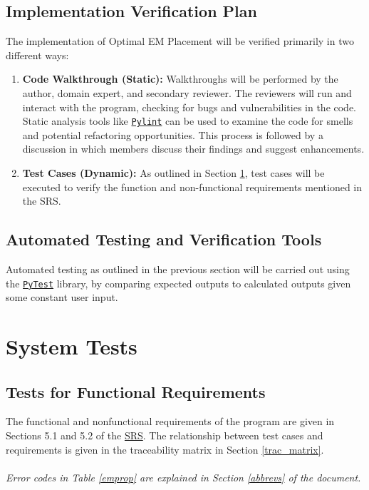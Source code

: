 \documentclass[12pt, titlepage]{article}
\begin{document}
\subsection{Implementation Verification Plan}
The implementation of Optimal EM Placement will be verified primarily in two different ways:
\begin{enumerate}
  \item \textbf{Code Walkthrough (Static): }Walkthroughs will be performed by the author, domain expert, and secondary reviewer. The reviewers will run and interact with the program, checking for bugs and vulnerabilities in the code. Static analysis tools like \href{https://github.com/pylint-dev/pylint}{\texttt{Pylint}} can be used to examine the code for smells and potential refactoring opportunities. This process is followed by a discussion in which members discuss their findings and suggest enhancements.  
  \item \textbf{Test Cases (Dynamic): }As outlined in Section \ref{sys_tests}, test cases will be executed to verify the function and non-functional requirements mentioned in the SRS. 
\end{enumerate}

\subsection{Automated Testing and Verification Tools} \label{ver_tools}
Automated testing as outlined in the previous section will be carried out using the \href{https://docs.pytest.org/en/stable/}{\texttt{PyTest}} library, by comparing expected outputs to calculated outputs given some constant user input. 

\section{System Tests} \label{sys_tests}

\subsection{Tests for Functional Requirements}
The functional and nonfunctional requirements of the program are given in Sections 5.1 and 5.2 of the \href{https://github.com/husseinsd1/optimal-em-arrangement/blob/main/docs/SRS/SRS.pdf}{SRS}. The relationship between test cases and requirements is given in the traceability matrix in Section \ref{trac_matrix}. \\ \\
\noindent \emph{Error codes in Table \ref{emprop} are explained in Section \ref{abbrevs} of the document.}
\end{document}
